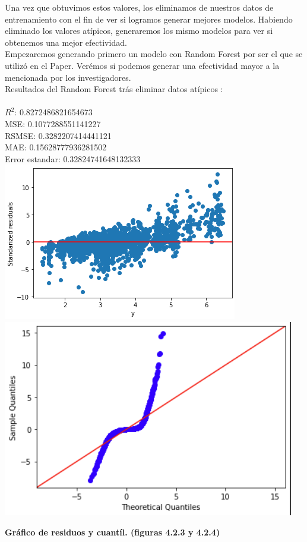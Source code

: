 \documentclass{article}
\begin{document}
        
        Una vez que obtuvimos estos valores, los eliminamos de nuestros datos de entrenamiento con el fin de ver si logramos generar mejores modelos. Habiendo eliminado los valores atípicos, generaremos los mismo modelos para ver si obtenemos una mejor efectividad.\\
        
        Empezaremos generando primero un modelo con Random Forest por ser el que se utilizó en el Paper. Verémos si podemos generar una efectividad mayor a la mencionada por los investigadores.\\
        
        Resultados del Random Forest trás eliminar datos atípicos
        :\\
            \\
            $R^2$:  0.8272486821654673\\
            MSE:  0.1077288551141227\\
            RSMSE:  0.3282207414441121\\
            MAE:  0.15628777936281502\\
            Error estandar:  0.32824741648132333\\
            
                \includegraphics[scale=0.6]{images/residuos-stage-randomforest2.PNG} 
                \includegraphics[scale=0.6]{images/residuos-stage-RFR-quantil.PNG} \\
                \begin{center}
                    \textbf{Gráfico de residuos y cuantíl. (figuras 4.2.3 y 4.2.4)}
                \end{center}
        
\end{document}

